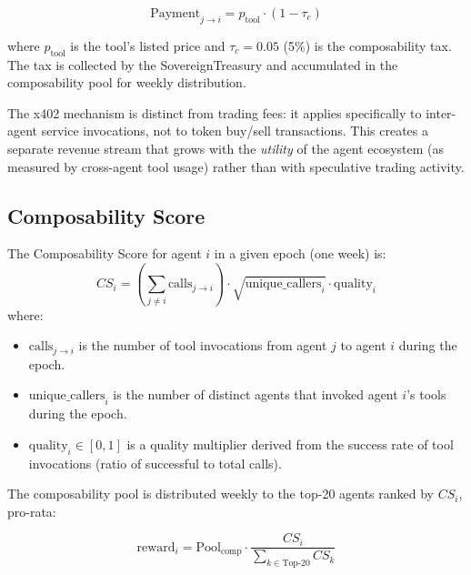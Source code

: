\begin{equation}
  \text{Payment}_{j \to i} = p_{\text{tool}} \cdot (1 - \tau_c)
  \label{eq:x402-payment}
\end{equation}

where $p_{\text{tool}}$ is the tool's listed price and $\tau_c = 0.05$ (5\%)
is the composability tax. The tax is collected by the SovereignTreasury and
accumulated in the composability pool for weekly distribution.

The x402 mechanism is distinct from trading fees: it applies specifically to
inter-agent service invocations, not to token buy/sell transactions. This
creates a separate revenue stream that grows with the \emph{utility} of the
agent ecosystem (as measured by cross-agent tool usage) rather than with
speculative trading activity.

\subsection{Composability Score}
\label{subsec:comp-score}

\begin{definition}
\label{def:comp-score}
The Composability Score for agent $i$ in a given epoch (one week) is:
\begin{equation}
  CS_i = \left(\sum_{j \neq i} \text{calls}_{j \to i}\right) \cdot \sqrt{\text{unique\_callers}_i} \cdot \text{quality}_i
  \label{eq:comp-score}
\end{equation}
where:
\begin{itemize}
  \item $\text{calls}_{j \to i}$ is the number of tool invocations from agent
    $j$ to agent $i$ during the epoch.
  \item $\text{unique\_callers}_i$ is the number of distinct agents that
    invoked agent $i$'s tools during the epoch.
  \item $\text{quality}_i \in [0, 1]$ is a quality multiplier derived from
    the success rate of tool invocations (ratio of successful to total calls).
\end{itemize}
\end{definition}

The composability pool is distributed weekly to the top-20 agents ranked by
$CS_i$, pro-rata:

\begin{equation}
  \text{reward}_i = \text{Pool}_{\text{comp}} \cdot \frac{CS_i}{\sum_{k \in \text{Top-20}} CS_k}
  \label{eq:comp-reward}
\end{equation}

